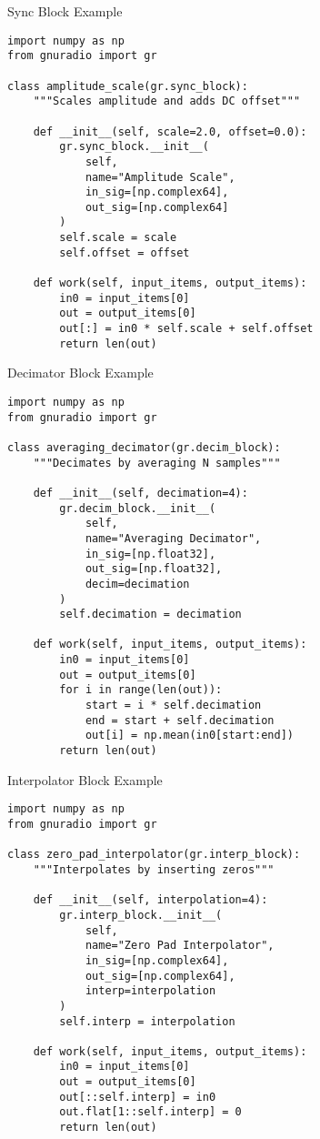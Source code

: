 \documentclass[aspectratio=169,11pt]{beamer}
\begin{document}
\begin{frame}[fragile]{Sync Block Example}
\begin{verbatim}
import numpy as np
from gnuradio import gr

class amplitude_scale(gr.sync_block):
    """Scales amplitude and adds DC offset"""
    
    def __init__(self, scale=2.0, offset=0.0):
        gr.sync_block.__init__(
            self,
            name="Amplitude Scale",
            in_sig=[np.complex64],
            out_sig=[np.complex64]
        )
        self.scale = scale
        self.offset = offset
    
    def work(self, input_items, output_items):
        in0 = input_items[0]
        out = output_items[0]
        out[:] = in0 * self.scale + self.offset
        return len(out)
\end{verbatim}
\end{frame}

\begin{frame}[fragile]{Decimator Block Example}
\begin{verbatim}
import numpy as np
from gnuradio import gr

class averaging_decimator(gr.decim_block):
    """Decimates by averaging N samples"""
    
    def __init__(self, decimation=4):
        gr.decim_block.__init__(
            self,
            name="Averaging Decimator",
            in_sig=[np.float32],
            out_sig=[np.float32],
            decim=decimation
        )
        self.decimation = decimation
    
    def work(self, input_items, output_items):
        in0 = input_items[0]
        out = output_items[0]
        for i in range(len(out)):
            start = i * self.decimation
            end = start + self.decimation
            out[i] = np.mean(in0[start:end])
        return len(out)
\end{verbatim}
\end{frame}

\begin{frame}[fragile]{Interpolator Block Example}
\begin{verbatim}
import numpy as np
from gnuradio import gr

class zero_pad_interpolator(gr.interp_block):
    """Interpolates by inserting zeros"""
    
    def __init__(self, interpolation=4):
        gr.interp_block.__init__(
            self,
            name="Zero Pad Interpolator",
            in_sig=[np.complex64],
            out_sig=[np.complex64],
            interp=interpolation
        )
        self.interp = interpolation
    
    def work(self, input_items, output_items):
        in0 = input_items[0]
        out = output_items[0]
        out[::self.interp] = in0
        out.flat[1::self.interp] = 0
        return len(out)
\end{verbatim}
\end{frame}
\end{document}
